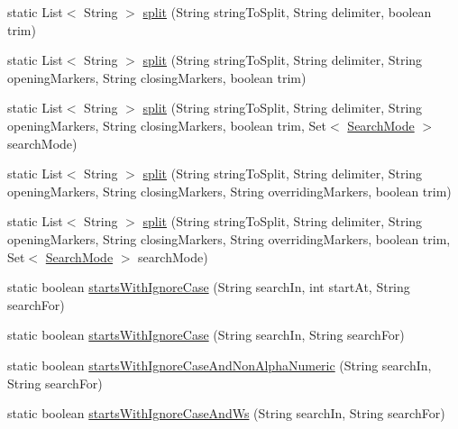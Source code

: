 \begin{DoxyCompactItemize}
\item 
static List$<$ String $>$ \mbox{\hyperlink{classcom_1_1mysql_1_1cj_1_1util_1_1_string_utils_a7415fcd4dc83631e7840f2784c2332f9}{split}} (String string\+To\+Split, String delimiter, boolean trim)
\item 
static List$<$ String $>$ \mbox{\hyperlink{classcom_1_1mysql_1_1cj_1_1util_1_1_string_utils_af08e2c13d9f2391bc11c83623e23a178}{split}} (String string\+To\+Split, String delimiter, String opening\+Markers, String closing\+Markers, boolean trim)
\item 
static List$<$ String $>$ \mbox{\hyperlink{classcom_1_1mysql_1_1cj_1_1util_1_1_string_utils_affdf59620285d1e99161cb7f09f934b1}{split}} (String string\+To\+Split, String delimiter, String opening\+Markers, String closing\+Markers, boolean trim, Set$<$ \mbox{\hyperlink{enumcom_1_1mysql_1_1cj_1_1util_1_1_string_utils_1_1_search_mode}{Search\+Mode}} $>$ search\+Mode)
\item 
static List$<$ String $>$ \mbox{\hyperlink{classcom_1_1mysql_1_1cj_1_1util_1_1_string_utils_a02cfd394f6f8bd6ec2a5e4e8541ae2bc}{split}} (String string\+To\+Split, String delimiter, String opening\+Markers, String closing\+Markers, String overriding\+Markers, boolean trim)
\item 
static List$<$ String $>$ \mbox{\hyperlink{classcom_1_1mysql_1_1cj_1_1util_1_1_string_utils_a6f82f2224187e8d46fd9dedf5da1965f}{split}} (String string\+To\+Split, String delimiter, String opening\+Markers, String closing\+Markers, String overriding\+Markers, boolean trim, Set$<$ \mbox{\hyperlink{enumcom_1_1mysql_1_1cj_1_1util_1_1_string_utils_1_1_search_mode}{Search\+Mode}} $>$ search\+Mode)
\item 
static boolean \mbox{\hyperlink{classcom_1_1mysql_1_1cj_1_1util_1_1_string_utils_a4698191aed0b4000670f7315e3c3b2e2}{starts\+With\+Ignore\+Case}} (String search\+In, int start\+At, String search\+For)
\item 
static boolean \mbox{\hyperlink{classcom_1_1mysql_1_1cj_1_1util_1_1_string_utils_a41a050a870f5bed35d40f2a5d57ccae2}{starts\+With\+Ignore\+Case}} (String search\+In, String search\+For)
\item 
static boolean \mbox{\hyperlink{classcom_1_1mysql_1_1cj_1_1util_1_1_string_utils_a0d5a764ceb465c096e7b2b24d444e773}{starts\+With\+Ignore\+Case\+And\+Non\+Alpha\+Numeric}} (String search\+In, String search\+For)
\item 
static boolean \mbox{\hyperlink{classcom_1_1mysql_1_1cj_1_1util_1_1_string_utils_a2298af2ffee1efab8d573b5c22402008}{starts\+With\+Ignore\+Case\+And\+Ws}} (String search\+In, String search\+For)

\end{DoxyCompactItemize}
